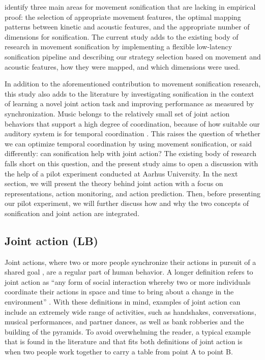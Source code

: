 \documentclass[10pt,a4paper,onecolumn]{article}
\begin{document}
\textcite{vinkenAuditoryCodingHuman2013} identify three main areas for movement sonification that are lacking in empirical proof: the selection of appropriate movement features, the optimal mapping patterns between kinetic and acoustic features, and the appropriate number of dimensions for sonification. The current study adds to the existing body of research in movement sonification by implementing a flexible low-latency sonification pipeline and describing our strategy selection based on movement and acoustic features, how they were mapped, and which dimensions were used.

In addition to the aforementioned contribution to movement sonification research, this study also adds to the literature by investigating sonification in the context of learning a novel joint action task and improving performance as measured by synchronization. Music belongs to the relatively small set of joint action behaviors that support a high degree of coordination, because of how suitable our auditory system is for temporal coordination \autocite{hildebrandtShortPaperEnhancing2014}. This raises the question of whether we can optimize temporal coordination by using movement sonification, or said differently: can sonification help with joint action? The existing body of research falls short on this question, and the present study aims to open a discussion with the help of a pilot experiment conducted at Aarhus University. In the next section, we will present the theory behind joint action with a focus on representations, action monitoring, and action prediction. Then, before presenting our pilot experiment, we will further discuss how and why the two concepts of sonification and joint action are integrated.

\hypertarget{joint-action-lb}{%
\subsection{Joint action (LB)}\label{joint-action-lb}}

Joint actions, where two or more people synchronize their actions in pursuit of a shared goal \autocite{knoblichPsychologicalResearchJoint2011}, are a regular part of human behavior. A longer definition refers to joint action as ``any form of social interaction whereby two or more individuals coordinate their actions in space and time to bring about a change in the environment'' \autocite[p.~1]{sebanzJointActionBodies2006}. With these definitions in mind, examples of joint action can include an extremely wide range of activities, such as handshakes, conversations, musical performances, and partner dances, as well as bank robberies and the building of the pyramids. To avoid overwhelming the reader, a typical example that is found in the literature \autocite{sebanzJointActionBodies2006} and that fits both definitions of joint action is when two people work together to carry a table from point A to point B.
\end{document}
